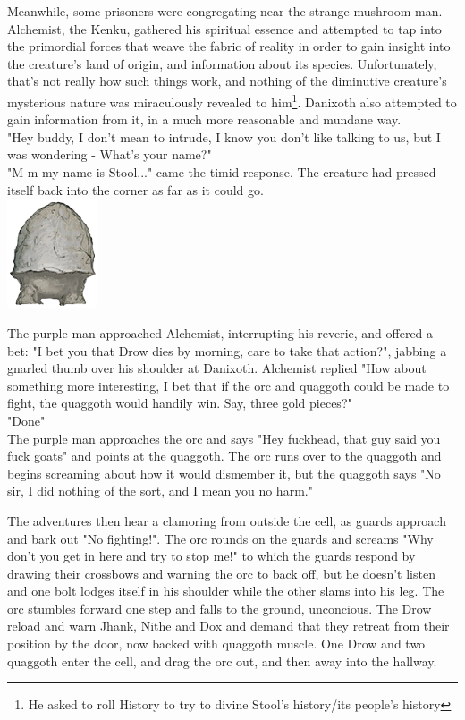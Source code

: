 \documentclass[letterpaper,10pt,twoside,twocolumn,openany]{book}
\begin{document}
Meanwhile, some prisoners were congregating near the strange mushroom man. Alchemist, the Kenku, gathered his spiritual essence and attempted to tap into the primordial forces that weave the fabric of reality in order to gain insight into the creature's land of origin, and information about its species. Unfortunately, that's not really how such things work, and nothing of the diminutive creature's mysterious nature was miraculously revealed to him\footnote{He asked to roll History to try to divine Stool's history/its people's history}. Danixoth also attempted to gain information from it, in a much more reasonable and mundane way.\\
"Hey buddy, I don't mean to intrude, I know you don't like talking to us, but I was wondering - What's your name?"\\
"M-m-my name is Stool..." came the timid response. The creature had pressed itself back into the corner as far as it could go.\\
{\centering
	\includegraphics[width=0.2\textwidth]{img/dist/stool.png}
}

The purple man approached Alchemist, interrupting his reverie, and offered a bet: "I bet you that Drow dies by morning, care to take that action?", jabbing a gnarled thumb over his shoulder at Danixoth. Alchemist replied "How about something more interesting, I bet that if the orc and quaggoth could be made to fight, the quaggoth would handily win. Say, three gold pieces?"\\
"Done"\\

The purple man approaches the orc and says "Hey fuckhead, that guy said you fuck goats" and points at the quaggoth. The orc runs over to the quaggoth and begins screaming about how it would dismember it, but the quaggoth says "No sir, I did nothing of the sort, and I mean you no harm."

The adventures then hear a clamoring from outside the cell, as guards approach and bark out "No fighting!". The orc rounds on the guards and screams "Why don't you get in here and try to stop me!" to which the guards respond by drawing their crossbows and warning the orc to back off, but he doesn't listen and one bolt lodges itself in his shoulder while the other slams into his leg. The orc stumbles forward one step and falls to the ground, unconcious. The Drow reload and warn Jhank, Nithe and Dox and demand that they retreat from their position by the door, now backed with quaggoth muscle. One Drow and two quaggoth enter the cell, and drag the orc out, and then away into the hallway.
\end{document}
